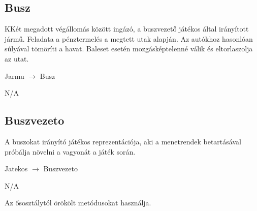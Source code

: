 \subsection{Busz}
\begin{class-template-responsibility}
   KKét megadott végállomás között ingázó, a buszvezető játékos által irányított jármű. Feladata a pénztermelés a megtett utak alapján. Az autókhoz hasonlóan súlyával tömöríti a havat. Baleset esetén mozgásképtelenné válik és eltorlaszolja az utat.
\end{class-template-responsibility}
\begin{class-template-baseclass}
    Jarmu $\rightarrow$ Busz
\end{class-template-baseclass}
\begin{class-template-interface}
    N/A
\end{class-template-interface}
\begin{class-template-attribute}
\end{class-template-attribute}
\begin{class-template-method}
\end{class-template-method}

\subsection{Buszvezeto}
\begin{class-template-responsibility}
    A buszokat irányító játékos reprezentációja, aki a menetrendek betartásával próbálja növelni a vagyonát a játék során.
\end{class-template-responsibility}
\begin{class-template-baseclass}
    Jatekos $\rightarrow$ Buszvezeto
\end{class-template-baseclass}
\begin{class-template-interface}
    N/A
\end{class-template-interface}
\begin{class-template-attribute}
\end{class-template-attribute}
\begin{class-template-method}
    Az ősosztálytól örökölt metódusokat használja.
\end{class-template-method}

